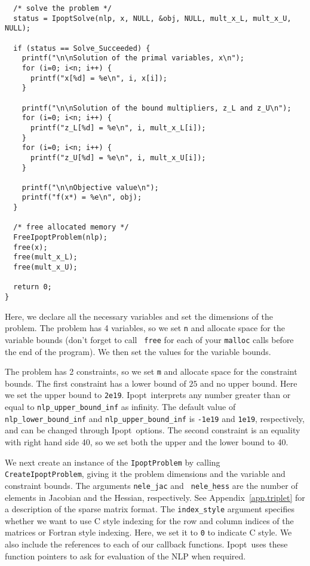\documentclass[10pt]{article}
\newcommand{\Ipopt}{{\sc Ipopt}}
\begin{document}
\begin{footnotesize}
\begin{verbatim}
  /* solve the problem */
  status = IpoptSolve(nlp, x, NULL, &obj, NULL, mult_x_L, mult_x_U, NULL);

  if (status == Solve_Succeeded) {
    printf("\n\nSolution of the primal variables, x\n");
    for (i=0; i<n; i++) {
      printf("x[%d] = %e\n", i, x[i]); 
    }

    printf("\n\nSolution of the bound multipliers, z_L and z_U\n");
    for (i=0; i<n; i++) {
      printf("z_L[%d] = %e\n", i, mult_x_L[i]); 
    }
    for (i=0; i<n; i++) {
      printf("z_U[%d] = %e\n", i, mult_x_U[i]); 
    }

    printf("\n\nObjective value\n");
    printf("f(x*) = %e\n", obj); 
  }
 
  /* free allocated memory */
  FreeIpoptProblem(nlp);
  free(x);
  free(mult_x_L);
  free(mult_x_U);

  return 0;
}
\end{verbatim}
\end{footnotesize}

Here, we declare all the necessary variables and set the dimensions of
the problem.  The problem has 4 variables, so we set {\tt n} and
allocate space for the variable bounds (don't forget to call {\tt
  free} for each of your {\tt malloc} calls before the end of the
program). We then set the values for the variable bounds.

The problem has 2 constraints, so we set {\tt m} and allocate space
for the constraint bounds. The first constraint has a lower bound of
$25$ and no upper bound.  Here we set the upper bound to
\texttt{2e19}. \Ipopt\ interprets any number greater than or equal to
\texttt{nlp\_upper\_bound\_inf} as infinity. The default value of
\texttt{nlp\_lower\_bound\_inf} and \texttt{nlp\_upper\_bound\_inf} is
\texttt{-1e19} and \texttt{1e19}, respectively, and can be changed
through \Ipopt\ options.  The second constraint is an equality with
right hand side 40, so we set both the upper and the lower bound to
40.

We next create an instance of the {\tt IpoptProblem} by calling {\tt
CreateIpoptProblem}, giving it the problem dimensions and the variable
and constraint bounds. The arguments {\tt nele\_jac} and {\tt
nele\_hess} are the number of elements in Jacobian and the Hessian,
respectively. See Appendix~\ref{app.triplet} for a description of the
sparse matrix format. The {\tt index\_style} argument specifies whether
we want to use C style indexing for the row and column indices of the
matrices or Fortran style indexing. Here, we set it to {\tt 0} to
indicate C style.  We also include the references to each of our
callback functions. \Ipopt\ uses these function pointers to ask for
evaluation of the NLP when required.
\end{document}
